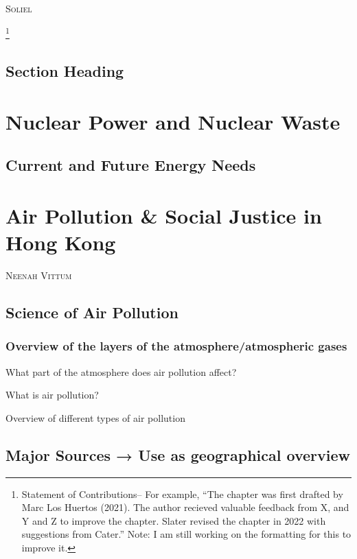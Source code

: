 \documentclass{book}\usepackage{knitr}
\makeatletter
\newcommand{\chapterauthor}[1]{%
  {\parindent0pt\vspace*{-25pt}%
  \linespread{1.1}\large\scshape#1%
  \par\nobreak\vspace*{35pt}}
  \@afterheading%
}
\makeatother
\begin{document}
\chapterauthor{Soliel}

\footnote{Statement of Contributions-- For example, ``The chapter was first drafted by Marc Los Huertos (2021). The author recieved valuable feedback from X, and Y and Z to improve the chapter. Slater revised the chapter in 2022 with suggestions from Cater.'' Note: I am still working on the formatting for this to improve it.}

\section{Section Heading}%



\chapter{Nuclear Power and Nuclear Waste}

\section{Current and Future Energy Needs}



\chapter{Air Pollution \& Social Justice in Hong Kong}

\chapterauthor{Neenah Vittum}

\section{Science of Air Pollution}

\subsection{Overview of the layers of the atmosphere/atmospheric gases}

What part of the atmosphere does air pollution affect?

What is air pollution?

Overview of different types of air pollution

\section{Major Sources → Use as geographical overview}
\end{document}
